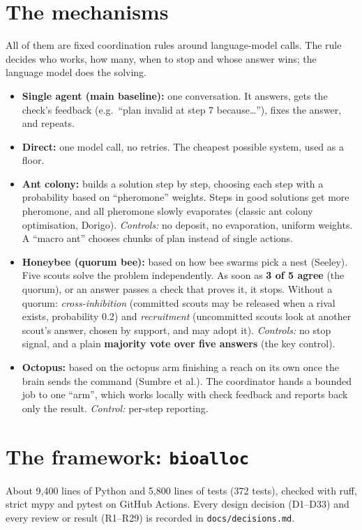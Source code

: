 \documentclass[11pt,a4paper]{article}
\begin{document}
\section{The mechanisms}
All of them are fixed coordination rules around language-model calls. The rule decides who works, how
many, when to stop and whose answer wins; the language model does the solving.
\begin{itemize}
  \item \textbf{Single agent (main baseline):} one conversation. It answers, gets the check's feedback
        (e.g.\ ``plan invalid at step 7 because\ldots''), fixes the answer, and repeats.
  \item \textbf{Direct:} one model call, no retries. The cheapest possible system, used as a floor.
  \item \textbf{Ant colony:} builds a solution step by step, choosing each step with a probability based on
        ``pheromone'' weights. Steps in good solutions get more pheromone, and all pheromone slowly
        evaporates (classic ant colony optimisation, Dorigo). \emph{Controls:} no deposit, no evaporation,
        uniform weights. A ``macro ant'' chooses chunks of plan instead of single actions.
  \item \textbf{Honeybee (quorum bee):} based on how bee swarms pick a nest (Seeley). Five scouts solve the
        problem independently. As soon as \textbf{3 of 5 agree} (the quorum), or an answer passes a check that
        proves it, it stops. Without a quorum: \emph{cross-inhibition} (committed scouts may be released
        when a rival exists, probability 0.2) and \emph{recruitment} (uncommitted scouts look at another
        scout's answer, chosen by support, and may adopt it). \emph{Controls:} no stop signal, and a plain
        \textbf{majority vote over five answers} (the key control).
  \item \textbf{Octopus:} based on the octopus arm finishing a reach on its own once the brain sends the
        command (Sumbre et al.). The coordinator hands a bounded job to one ``arm'', which works locally
        with check feedback and reports back only the result. \emph{Control:} per-step reporting.
\end{itemize}

\section{The framework: \texttt{bioalloc}}
About 9,400 lines of Python and 5,800 lines of tests (372 tests), checked with ruff, strict mypy and
pytest on GitHub Actions. Every design decision (D1--D33) and every review or result (R1--R29) is
recorded in \texttt{docs/decisions.md}.
\end{document}
